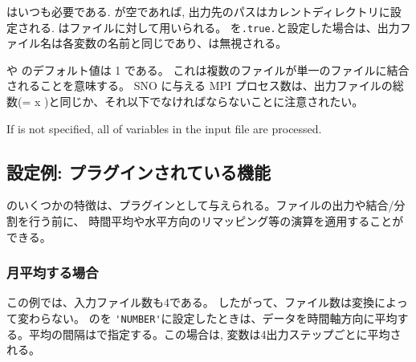 はいつも必要である. が空であれば, 出力先のパスはカレントディレクトリに設定される.
は\scalenetcdf ファイルに対して用いられる。 を\verb|.true.|と設定した場合は、出力ファイル名は各変数の名前と同じであり、は無視される。

 や  のデフォルト値は 1 である。 これは複数のファイルが単一のファイルに結合されることを意味する。
SNO に与える MPI プロセス数は、出力ファイルの総数(=  x )と同じか、それ以下でなければならないことに注意されたい。

If  is not specified, all of variables in the input file are processed.

\subsection{設定例: プラグインされている機能}

\sno のいくつかの特徴は、プラグインとして与えられる。ファイルの出力や結合/分割を行う前に、
時間平均や水平方向のリマッピング等の演算を適用することができる。

\subsubsection{月平均する場合}


この例では、入力ファイル数も4である。
したがって、ファイル数は変換によって変わらない。
 のを \verb|'NUMBER'|に設定したときは、データを時間軸方向に平均する。平均の間隔はで指定する。この場合は, 変数は4出力ステップごとに平均される。


